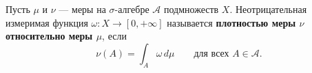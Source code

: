 \label{definition:30}

\begin{definition}
Пусть $\mu$ и $\nu$ --- меры на $\sigma$-алгебре $\mathcal A$ подмножеств $X$.
Неотрицательная измеримая функция $\omega:X\to[0,+\infty]$ называется \textbf{плотностью меры $\nu$ относительно меры $\mu$}, если
\[
  \nu(A)=\int_A\omega\,d\mu\qquad\text{для всех }A\in\mathcal A.
\]
\end{definition}
